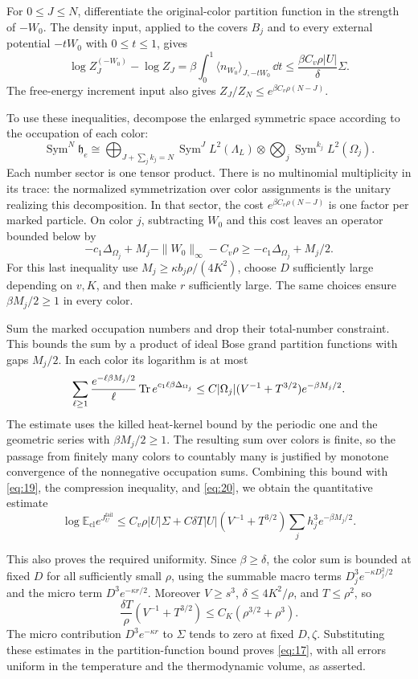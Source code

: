 For $0\le J\le N$, differentiate the original-color partition
function in the strength of $-W_0$.  The density input, applied
to the covers $B_j$ and to every external potential $-tW_0$ with
$0\le t\le1$, gives
\[
 \log Z_J^{(-W_0)}-\log Z_J
 =\beta\int_0^1\langle n_{W_0}\rangle_{J,-tW_0}\,\dd t
 \le\frac{\beta C_v\rho|U|}\delta\Sigma.
\]
The free-energy increment input also gives
$Z_J/Z_N\le e^{\beta C_v\rho(N-J)}$.

To use these inequalities, decompose the enlarged symmetric
space according to the occupation of each color:
\[
 \operatorname{Sym}^N\mathfrak h_e
 \cong
 \bigoplus_{J+\sum_j k_j=N}
  \operatorname{Sym}^J L^2(\Lambda_L)
       \otimes\bigotimes_j\operatorname{Sym}^{k_j}L^2(\Omega_j).
\]
Each number sector is one tensor product.  There is no
multinomial multiplicity in its trace: the normalized
symmetrization over color assignments is the unitary realizing
this decomposition.  In that sector, the cost
$e^{\beta C_v\rho(N-J)}$ is one factor per marked particle.
On color $j$, subtracting $W_0$ and this cost leaves an operator
bounded below by
\[
 -c_1\Delta_{\Omega_j}
                  +M_j-\|W_0\|_\infty-C_v\rho
 \ge -c_1\Delta_{\Omega_j}+M_j/2.
\]
For this last inequality use
$M_j\ge\kappa b_j\rho/(4K^2)$, choose $D$ sufficiently large
depending on $v,K$, and then make $r$ sufficiently large.
The same choices ensure $\beta M_j/2\ge1$ in every color.

Sum the marked occupation numbers and drop their total-number
constraint.  This bounds the sum by a product of ideal Bose
grand partition functions with gaps $M_j/2$.  In each color its
logarithm is at most
\[
 \sum_{\ell\ge1}\frac{e^{-\ell\beta M_j/2}}\ell
                       \operatorname{Tr} e^{c_1\ell\beta\Delta_{\Omega_j}}
 \le C|\Omega_j|(V^{-1}+T^{3/2})e^{-\beta M_j/2}.
\]
The estimate uses the killed heat-kernel bound by the periodic
one and the geometric series with $\beta M_j/2\ge1$.
The resulting sum over colors is finite, so the passage from
finitely many colors to countably many is justified by
monotone convergence of the nonnegative occupation sums.
Combining this bound with \eqref{eq:19}, the compression
inequality, and \eqref{eq:20}, we obtain the quantitative estimate
\begin{equation*}
 \log\mathbb E_{\mathrm{cl}}e^{J_U^{\mathrm{fail}}}
 \le C_v\rho|U|\Sigma
  +C\delta T|U|(V^{-1}+T^{3/2})
                     \sum_jh_j^3e^{-\beta M_j/2}.
\end{equation*}

This also proves the required uniformity.  Since $\beta\ge\delta$,
the color sum is bounded at fixed $D$ for all sufficiently small
$\rho$, using the summable macro terms
$D_j^3e^{-\kappa D_j^2/2}$ and the micro term
$D^3e^{-\kappa r/2}$.  Moreover $V\ge s^3$,
$\delta\le4K^2/\rho$, and $T\le\rho^2$, so
\[
 \frac{\delta T}{\rho}(V^{-1}+T^{3/2})
 \le C_K(\rho^{3/2}+\rho^3).
\]
The micro contribution $D^3e^{-\kappa r}$ to $\Sigma$ tends
to zero at fixed $D,\zeta$.  Substituting these estimates in the
partition-function bound proves \eqref{eq:17}, with
all errors uniform in the temperature and the thermodynamic
volume, as asserted.
